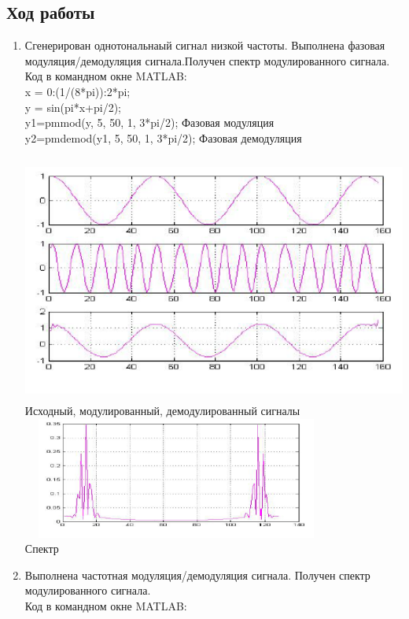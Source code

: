 \documentclass[10pt,a4paper]{article}
\begin{document}
\subsection{Ход работы}
\begin{enumerate}
\item Сгенерирован однотональнаый сигнал низкой частоты. Выполнена фазовая модуляция/демодуляция сигнала.Получен спектр модулированного сигнала.
Код в командном окне MATLAB:
\\
x = 0:(1/(8*pi)):2*pi;
\\
y = sin(pi*x+pi/2); 
\\
y1=pmmod(y, 5, 50, 1, 3*pi/2); Фазовая модуляция
\\
y2=pmdemod(y1, 5, 50, 1, 3*pi/2); Фазовая демодуляция
\\
\\
\includegraphics[width=6in,height=80mm]{r81}
\\
Исходный, модулированный, демодулированный сигналы
\\
\includegraphics[width=4in,height=40mm]{r82}
\\
Спектр
\\
\item Выполнена частотная модуляция/демодуляция сигнала. Получен спектр модулированного сигнала.
\\Код в командном окне MATLAB:
\\

\end{enumerate}
\end{document}
